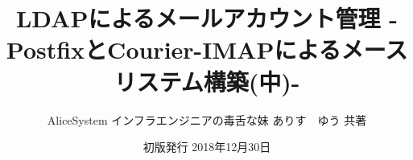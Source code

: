 \title{LDAPによるメールアカウント管理 -PostfixとCourier-IMAPによるメースリステム構築(中)-}
\author{AliceSystem インフラエンジニアの毒舌な妹 ありす　ゆう 共著}
\date{初版発行 2018年12月30日}